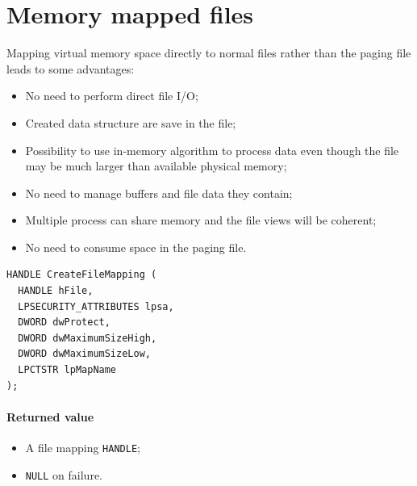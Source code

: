 \section{Memory mapped files}
Mapping virtual memory space directly to normal files rather than the paging file leads to some advantages:
\begin{itemize}
\item No need to perform direct file I/O;
\item Created data structure are save in the file;
\item Possibility to use in-memory algorithm to process data even though the file may be much larger than available physical memory;
\item No need to manage buffers and file data they contain;
\item Multiple process can share memory and the file views will be coherent;
\item No need to consume space in the paging file.
\end{itemize}

\begin{verbatim}
HANDLE CreateFileMapping (
  HANDLE hFile,
  LPSECURITY_ATTRIBUTES lpsa,
  DWORD dwProtect,
  DWORD dwMaximumSizeHigh,
  DWORD dwMaximumSizeLow,
  LPCTSTR lpMapName
);
\end{verbatim}

\paragraph{Returned value}
\begin{itemize}
\item A file mapping \texttt{HANDLE};
\item \texttt{NULL} on failure.
\end{itemize}

